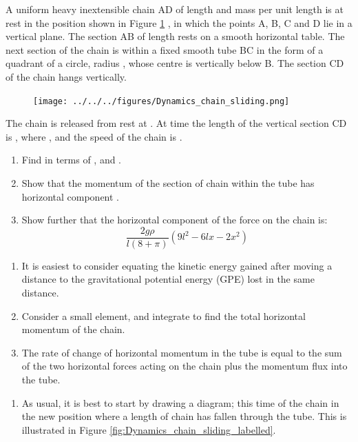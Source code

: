 
\begin{problem}
{A uniform heavy inextensible chain AD of length  and mass \vari{\rho} per unit length is at rest in the position shown in Figure \ref{fig:Dynamics_chain_sliding} , in which the points A, B, C and D lie in a vertical plane. The section AB of length  rests on a smooth horizontal table. The next section of the chain is within a fixed smooth tube BC in the form of a quadrant of a circle, radius , whose centre  is vertically below B. The section CD of the chain hangs vertically.

\begin{figure}[h!]
\centering
\texttt{[image: ../../../figures/Dynamics\_chain\_sliding.png]}
\caption{}\label{fig:Dynamics_chain_sliding}
\end{figure}

The chain is released from rest at . At time  the length of the vertical section CD is , where , and the speed of the chain is .
\begin{enumerate}
	\item Find  in terms of ,  and .
	\item Show that the momentum of the section of chain within the tube has horizontal component .
	\item Show further that the horizontal component of the force on the chain is:
	\begin{equation*} 
	\frac{2g \rho}{l(8 + \pi)} \left( 9l^{2} - 6lx - 2x^{2} \right) 
	\end{equation*}
\end{enumerate}
\begin{enumerate}
	\item It is easiest to consider equating the kinetic energy gained after moving a distance  to the gravitational potential energy (GPE) lost in the same distance.
	\item Consider a small element, and integrate %
to find the total horizontal momentum of the chain.%
	\item The rate of change of horizontal momentum in the tube is equal to the sum of the two horizontal forces acting on the chain plus the momentum flux into the tube. 
\end{enumerate}
}
{}
{\begin{enumerate}
	\item As usual, it is best to start by drawing a diagram; this time of the chain in the new position where a length  of chain has fallen through the tube. This is illustrated in Figure \ref{fig:Dynamics_chain_sliding_labelled}.


\end{enumerate}}
\end{problem}
